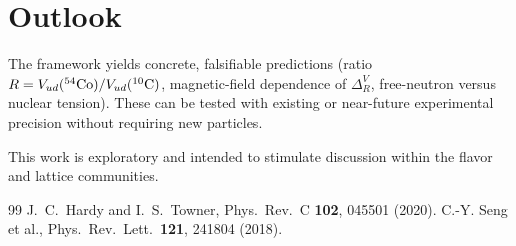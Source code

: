 \documentclass[aps,prd,preprint,amsmath,amssymb]{revtex4-2}
\begin{document}
\section{Outlook}
The framework yields concrete, falsifiable predictions (ratio $R=V_{ud}(^{54}{\rm Co})/V_{ud}(^{10}{\rm C})$, magnetic-field dependence of $\Delta_R^V$, free-neutron versus nuclear tension). These can be tested with existing or near-future experimental precision without requiring new particles.

\begin{acknowledgments}
This work is exploratory and intended to stimulate discussion within the flavor and lattice communities.
\end{acknowledgments}

\begin{thebibliography}{99}
 J.\ C.\ Hardy and I.\ S.\ Towner, Phys.\ Rev.\ C \textbf{102}, 045501 (2020).
 C.-Y. Seng et al., Phys.\ Rev.\ Lett.\ \textbf{121}, 241804 (2018).
\end{thebibliography}
\end{document}
